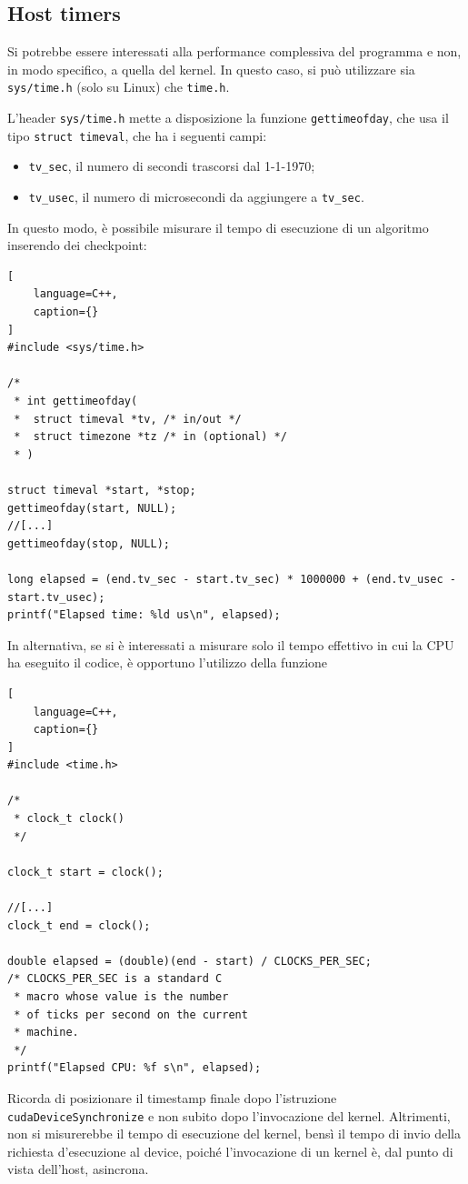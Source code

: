 \subsection{Host timers}
Si potrebbe essere interessati alla performance complessiva del programma e non, in modo specifico, a quella del kernel.
In questo caso, si può utilizzare sia \texttt{sys/time.h} (solo su Linux) che \texttt{time.h}.

L'header \texttt{sys/time.h} mette a disposizione la funzione \texttt{gettimeofday}, che usa il tipo \texttt{struct timeval}, che ha i seguenti campi:
\begin{itemize}
    \item \texttt{tv\_sec}, il numero di secondi trascorsi dal 1-1-1970;
    \item \texttt{tv\_usec}, il numero di microsecondi da aggiungere a \texttt{tv\_sec}.
\end{itemize}
In questo modo, è possibile misurare il tempo di esecuzione di un algoritmo inserendo dei checkpoint:
\begin{lstlisting}[
    language=C++,
    caption={}
]
#include <sys/time.h>

/*
 * int gettimeofday(
 *  struct timeval *tv, /* in/out */
 *  struct timezone *tz /* in (optional) */
 * )

struct timeval *start, *stop;
gettimeofday(start, NULL);
//[...]
gettimeofday(stop, NULL);

long elapsed = (end.tv_sec - start.tv_sec) * 1000000 + (end.tv_usec - start.tv_usec);
printf("Elapsed time: %ld us\n", elapsed);
\end{lstlisting}

In alternativa, se si è interessati a misurare solo il tempo effettivo in cui la CPU ha eseguito il codice, è opportuno l'utilizzo della funzione

\begin{lstlisting}[
    language=C++,
    caption={}
]
#include <time.h>

/* 
 * clock_t clock()
 */

clock_t start = clock();
	
//[...]
clock_t end = clock();
	
double elapsed = (double)(end - start) / CLOCKS_PER_SEC;
/* CLOCKS_PER_SEC is a standard C
 * macro whose value is the number
 * of ticks per second on the current
 * machine.
 */
printf("Elapsed CPU: %f s\n", elapsed);
\end{lstlisting}

\begin{note}{}
    Ricorda di posizionare il timestamp finale dopo l'istruzione \texttt{cudaDeviceSynchronize} e non subito dopo l'invocazione del kernel.
    Altrimenti, non si misurerebbe il tempo di esecuzione del kernel, bensì il tempo di invio della richiesta d'esecuzione al device, poiché l'invocazione di un kernel è, dal punto di vista dell'host, asincrona.
\end{note}

